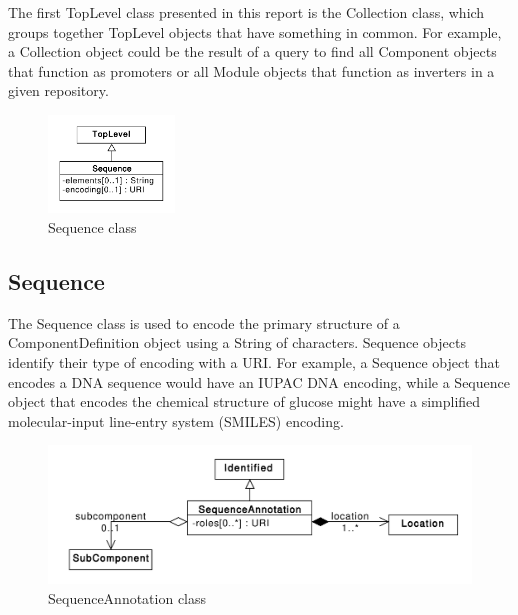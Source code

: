 \documentclass[draftspec]{sbmlpkgspec}
\begin{document}
The first TopLevel class presented in this report is the Collection class, which groups together TopLevel objects that have something in common. For example, a Collection object could be the result of a query to find all Component objects that function as promoters or all Module objects that function as inverters in a given repository. 

\begin{figure}[h]
\begin{center}
\includegraphics[width=0.3\textwidth]{uml/sequence}
\caption[]{Sequence class}
\label{uml:sequence}
\end{center}
\end{figure}

\subsection{Sequence}

The Sequence class is used to encode the primary structure of a ComponentDefinition object using a String of characters. Sequence objects identify their type of encoding with a URI. For example, a Sequence object that encodes a DNA sequence would have an IUPAC DNA encoding, while a Sequence object that encodes the chemical structure of glucose might have a simplified molecular-input line-entry system (SMILES) encoding. 

\begin{figure}[h]
\begin{center}
\includegraphics[width=\textwidth]{uml/sequence_annotation}
\caption[]{SequenceAnnotation class}
\label{uml:sequence_annotation}
\end{center}
\end{figure}
\end{document}
